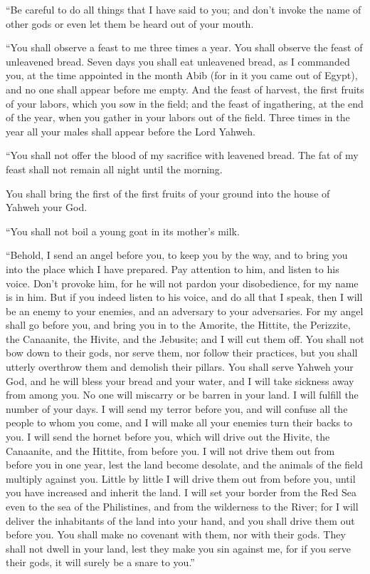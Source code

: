  ``Be careful to do all things that I have said to you; and
don't invoke the name of other gods or even let them be heard out of
your mouth.

 ``You shall observe a feast to me three times a year.
 You shall observe the feast of unleavened bread. Seven
days you shall eat unleavened bread, as I commanded you, at the time
appointed in the month Abib (for in it you came out of Egypt), and no
one shall appear before me empty.  And the feast of
harvest, the first fruits of your labors, which you sow in the field;
and the feast of ingathering, at the end of the year, when you gather in
your labors out of the field.  Three times in the year all
your males shall appear before the Lord Yahweh.

 ``You shall not offer the blood of my sacrifice with
leavened bread. The fat of my feast shall not remain all night until the
morning.

 You shall bring the first of the first fruits of your
ground into the house of Yahweh your God.

``You shall not boil a young goat in its mother's milk.

 ``Behold, I send an angel before you, to keep you by the
way, and to bring you into the place which I have prepared.
 Pay attention to him, and listen to his voice. Don't
provoke him, for he will not pardon your disobedience, for my name is in
him.  But if you indeed listen to his voice, and do all
that I speak, then I will be an enemy to your enemies, and an adversary
to your adversaries.  For my angel shall go before you, and
bring you in to the Amorite, the Hittite, the Perizzite, the Canaanite,
the Hivite, and the Jebusite; and I will cut them off.  You
shall not bow down to their gods, nor serve them, nor follow their
practices, but you shall utterly overthrow them and demolish their
pillars.  You shall serve Yahweh your God, and he will
bless your bread and your water, and I will take sickness away from
among you.  No one will miscarry or be barren in your land.
I will fulfill the number of your days.  I will send my
terror before you, and will confuse all the people to whom you come, and
I will make all your enemies turn their backs to you.  I
will send the hornet before you, which will drive out the Hivite, the
Canaanite, and the Hittite, from before you.  I will not
drive them out from before you in one year, lest the land become
desolate, and the animals of the field multiply against you.
 Little by little I will drive them out from before you,
until you have increased and inherit the land.  I will set
your border from the Red Sea even to the sea of the Philistines, and
from the wilderness to the River; for I will deliver the inhabitants of
the land into your hand, and you shall drive them out before you.
 You shall make no covenant with them, nor with their gods.
 They shall not dwell in your land, lest they make you sin
against me, for if you serve their gods, it will surely be a snare to
you.''

